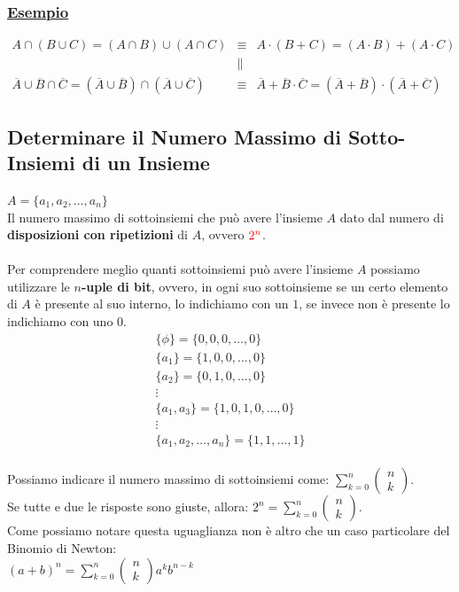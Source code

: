 \documentclass{article}
\begin{document}
\subsubsection{\underline{Esempio}}
$\begin{matrix}
A \cap (B \cup C) = (A \cap B) \cup (A \cap C) & \equiv & A \cdot (B + C) = (A \cdot B) + (A \cdot C) \\
& \parallel & \\
\overline{A} \cup \overline{B} \cap \overline{C} = \left( \overline{A} \cup \overline{B} \right) \cap \left( \overline{A} \cup \overline{C} \right) & \equiv & 
\overline{A} + \overline{B} \cdot \overline{C} = \left( \overline{A} + \overline{B} \right) \cdot \left( \overline{A} + \overline{C} \right)
\end{matrix}$

\subsection{Determinare il Numero Massimo di Sotto-Insiemi di un Insieme}
$A = \{ a_1,a_2, \dots , a_n \}$ \\
Il numero massimo di sottoinsiemi che può avere l’insieme $A$ dato dal numero di \textbf{disposizioni con ripetizioni} di $A$, ovvero $\color{red} 2^n$. \\ \\
Per comprendere meglio quanti sottoinsiemi può avere l’insieme $A$ possiamo utilizzare le \textbf{$n$-uple di bit}, ovvero, in ogni suo sottoinsieme se un certo elemento di $A$ è presente al suo interno, lo indichiamo con un $1$, se invece non è presente lo indichiamo con uno $0$. \\
\[\begin{matrix}
\{ \phi \} = \{0, 0, 0, \dots , 0\} \\
\{ a_1 \} = \{1, 0, 0, \dots , 0\} \\
\{ a_2 \} = \{0, 1, 0, \dots , 0\} \\
\vdots \\
\{a_1 , a_3 \} = \{ 1, 0, 1, 0, \dots , 0\} \\
\vdots \\
\{a_1, a_2, \dots , a_n\} = \{1, 1, \dots, 1\}
\end{matrix}\] \\
Possiamo indicare il numero massimo di sottoinsiemi come: $\sum_{k = 0}^{n} \left( \begin{matrix} n \\ k\end{matrix} \right)$. \\
Se tutte e due le risposte sono giuste, allora: $2^n =\sum_{k = 0}^{n} \left( \begin{matrix} n \\ k\end{matrix} \right)$. \\
Come possiamo notare questa uguaglianza non è altro che un caso particolare del Binomio di Newton: \\ $(a+b)^n = \sum_{k = 0}^{n} \left( \begin{matrix} n \\ k\end{matrix} \right) a^kb^{n-k}$
\end{document}
